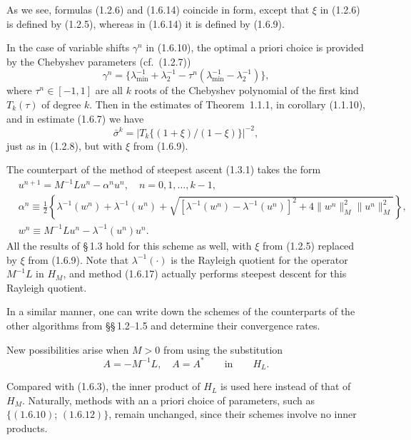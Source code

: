 \documentclass[11pt,oneside]{book}
\begin{document}
As we see, formulas (1.2.6) and (1.6.14) coincide in form, except that $\xi$ in (1.2.6) is defined by (1.2.5), whereas in (1.6.14) it is defined by (1.6.9).

In the case of variable shifts $\gamma^n$ in (1.6.10), the optimal a priori choice is provided by the Chebyshev parameters (cf.\ (1.2.7))
\[
\gamma^n = \{\lambda_{\min}^{-1} + \lambda_2^{-1} - \tau^n (\lambda_{\min}^{-1} - \lambda_2^{-1})\}, \tag{1.6.15} %
\]
where $\tau^n \in [-1, 1]$ are all $k$ roots of the Chebyshev polynomial of the first kind $T_k(\tau)$ of degree $k$. Then in the estimates of Theorem~1.1.1, in corollary (1.1.10), and in estimate (1.6.7) we have
\[
\bar{\sigma}^k = |T_k\{(1 + \xi) / (1 - \xi)\}|^{-2}, \tag{1.6.16}
\]
just as in (1.2.8), but with $\xi$ from (1.6.9).

The counterpart of the method of steepest ascent (1.3.1) takes the form
\[
\begin{aligned}
& u^{n+1} = M^{-1}Lu^n - \alpha^n u^n, \quad n = 0, 1, \ldots, k - 1, \\
& \alpha^n \equiv \frac{1}{2}\left\{\lambda^{-1}(w^n) + \lambda^{-1}(u^n) + \sqrt{[\lambda^{-1}(w^n) - \lambda^{-1}(u^n)]^2 + 4\|w^n\|_M^2 \|u^n\|_M^2}\right\}, \\ %
& w^n \equiv M^{-1}Lu^n - \lambda^{-1}(u^n)u^n.
\end{aligned} \tag{1.6.17}
\]
All the results of \S\,1.3 hold for this scheme as well, with $\xi$ from (1.2.5) replaced by $\xi$ from (1.6.9). Note that $\lambda^{-1}(\cdot)$ is the Rayleigh quotient for the operator $M^{-1}L$ in $H_M$, and method (1.6.17) actually performs steepest descent for this Rayleigh quotient.

In a similar manner, one can write down the schemes of the counterparts of the other algorithms from \S\S\,1.2--1.5 and determine their convergence rates.

New possibilities arise when $M > 0$ from using the substitution
\[
A = -M^{-1}L, \quad A = A^* \qquad \text{in} \qquad H_L. \tag{1.6.18}
\]

Compared with (1.6.3), the inner product of $H_L$ is used here instead of that of $H_M$. Naturally, methods with an a priori choice of parameters, such as $\{(1.6.10);\,(1.6.12)\}$, remain unchanged, since their schemes involve no inner products.
\end{document}
